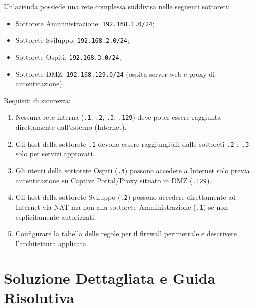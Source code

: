 \documentclass[11pt,a4paper]{article}
\begin{document}
\begin{questionbox}
Un'azienda possiede una rete complessa suddivisa nelle seguenti sottoreti:
\begin{itemize}
    \item Sottorete Amministrazione: \texttt{192.168.1.0/24};
    \item Sottorete Sviluppo: \texttt{192.168.2.0/24};
    \item Sottorete Ospiti: \texttt{192.168.3.0/24};
    \item Sottorete DMZ: \texttt{192.168.129.0/24} (ospita server web e proxy di autenticazione).
\end{itemize}
Requisiti di sicurezza:
\begin{enumerate}
    \item Nessuna rete interna (\texttt{.1}, \texttt{.2}, \texttt{.3}, \texttt{.129}) deve poter essere raggiunta direttamente dall'esterno (Internet).
    \item Gli host della sottorete \texttt{.1} devono essere raggiungibili dalle sottoreti \texttt{.2} e \texttt{.3} solo per servizi approvati.
    \item Gli utenti della sottorete Ospiti (\texttt{.3}) possono accedere a Internet solo previa autenticazione su Captive Portal/Proxy situato in DMZ (\texttt{.129}).
    \item Gli host della sottorete Sviluppo (\texttt{.2}) possono accedere direttamente ad Internet via NAT ma non alla sottorete Amministrazione (\texttt{.1}) se non esplicitamente autorizzati.
    \item Configurare la tabella delle regole per il firewall perimetrale e descrivere l'architettura applicata.
\end{enumerate}
\end{questionbox}

\newpage
\section{Soluzione Dettagliata e Guida Risolutiva}
\end{document}
